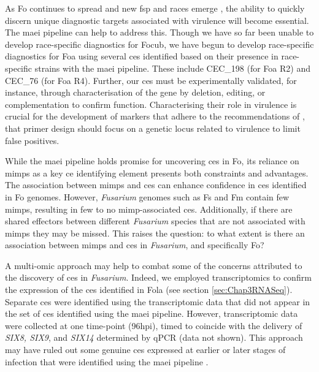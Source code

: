 As \ac{Fo} continues to spread and new \ac{fsp} and races emerge \parencite{Edel-Hermann2019, Henry2020, Mestdagh2023}, the ability to quickly discern unique diagnostic targets associated with virulence will become essential. The \ac{maei} pipeline can help to address this. Though we have so far been unable to develop race-specific diagnostics for \ac{Focub}, we have begun to develop race-specific diagnostics for \acf{Foa} using several \acp{ce} identified based on their presence in race-specific strains with the \ac{maei} pipeline. These include CEC\_198 (for \ac{Foa} R2) and CEC\_76 (for \ac{Foa} R4). Further, our \acfp{ce} must be experimentally validated, for instance, through characterisation of the gene by deletion, editing, or complementation to confirm function. Characterising their role in virulence is crucial for the development of markers that adhere to the recommendations of \textcite{Magdama2019}, that primer design should focus on a genetic locus related to virulence to limit false positives. 

While the \ac{maei} pipeline holds promise for uncovering \acp{ce} in \ac{Fo}, its reliance on \acp{mimp} as a key \ac{ce} identifying element presents both constraints and advantages. The association between \acp{mimp} and \acp{ce} can enhance confidence in \acp{ce} identified in \ac{Fo} genomes. However, \textit{Fusarium} genomes such as \acl{Fs} and \acl{Fm} contain few \acp{mimp}, resulting in few to no \ac{mimp}-associated \acp{ce}. Additionally, if there are shared effectors between different \textit{Fusarium} species that are not associated with \acp{mimp} they may be missed. This raises the question: to what extent is there an association between \acp{mimp} and \acp{ce} in \textit{Fusarium}, and specifically \ac{Fo}? 

A multi-omic approach may help to combat some of the concerns attributed to the discovery of \acp{ce} in \textit{Fusarium}. Indeed, we employed transcriptomics to confirm the expression of the \acp{ce} identified in \ac{Fola} (see section \ref{sec:Chap3RNASeq}). Separate \acp{ce} were identified using the transcriptomic data that did not appear in the set of \acp{ce} identified using the \ac{maei} pipeline. However, transcriptomic data were collected at one time-point (96\ac{hpi}), timed to coincide with the delivery of \textit{SIX8, SIX9}, and \textit{SIX14} determined by qPCR (data not shown). This approach may have ruled out some genuine \acp{ce} expressed at earlier or later stages of infection that were identified using the  \ac{maei} pipeline \parencite{Toruno2016}. 

